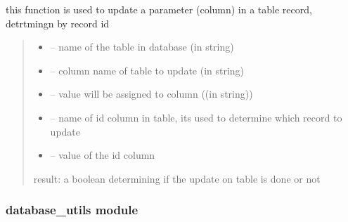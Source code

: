 \documentclass[letterpaper,10pt,english]{sphinxmanual}
\begin{document}
\begin{savenotes}
\begin{fulllineitems}
\begin{savenotes}\begin{fulllineitems}
\label{\detokenize{setting/database:oxin.database.dataBase.update_record}}
\pysigstartsignatures
{}
\pysigstopsignatures
\sphinxAtStartPar
this function is used to update a parameter (column) in a table record, detrtmingn by record id
\begin{quote}\begin{description}
\begin{itemize}
\item {} 
\sphinxAtStartPar
{} – name of the table in database (in string)

\item {} 
\sphinxAtStartPar
{} – column name of table to update (in string)

\item {} 
\sphinxAtStartPar
{} – value will be assigned to column ((in string))

\item {} 
\sphinxAtStartPar
{} – name of id column in table, its used to determine which record to update

\item {} 
\sphinxAtStartPar
{} – value of the id column

\end{itemize}

\sphinxAtStartPar
result: a boolean determining if the update on table is done or not

\end{description}\end{quote}

\end{fulllineitems}\end{savenotes}


\end{fulllineitems}\end{savenotes}


\sphinxstepscope


\subsubsection{database\_utils module}
\label{\detokenize{setting/database_utils:module-oxin.database_utils}}\label{\detokenize{setting/database_utils:database-utils-module}}\label{\detokenize{setting/database_utils::doc}}
\end{document}

